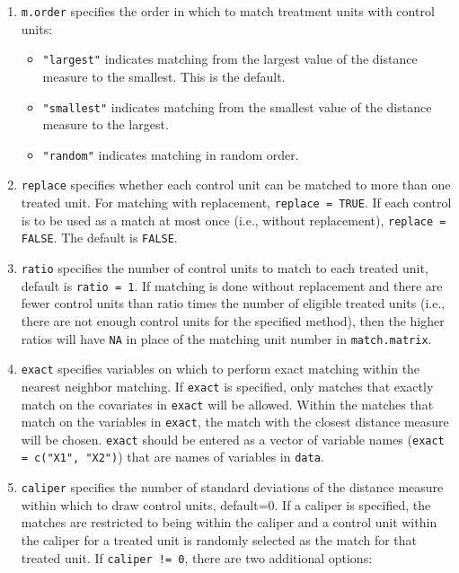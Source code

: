 \documentclass[oneside,letterpaper,titlepage]{article}
\begin{document}
\begin{enumerate}
\item \texttt{m.order}  specifies the order in which to match
  treatment units with control units:
  \begin{itemize}
  \item {\tt "largest"} indicates matching from the largest value of
    the distance measure to the smallest. This is the default.
  \item {\tt "smallest"} indicates matching from the smallest value of
    the distance measure to the largest.
  \item {\tt "random"} indicates matching in random order.
  \end{itemize}
\item \texttt{replace} specifies whether each control unit can be
  matched to more than one treated unit.  For matching with
  replacement, \texttt{replace = TRUE}.  If each control is to be used
  as a match at most once (i.e., without replacement), \texttt{replace
    = FALSE}. The default is {\tt FALSE}.
\item \texttt{ratio} specifies the number of control units to match to
  each treated unit, default is {\tt ratio = 1}.  If matching is done
  without replacement and there are fewer control units than ratio
  times the number of eligible treated units (i.e., there are not
  enough control units for the specified method), then the higher
  ratios will have \texttt{NA} in place of the matching unit number in
  \texttt{match.matrix}.
\item \texttt{exact} specifies variables on which to perform exact
  matching within the nearest neighbor matching.  If \texttt{exact} is
  specified, only matches that exactly match on the covariates in
  \texttt{exact} will be allowed.  Within the matches that match on
  the variables in \texttt{exact}, the match with the closest distance
  measure will be chosen.  \texttt{exact} should be entered as a
  vector of variable names (\texttt{exact = c("X1", "X2")}) that are
  names of variables in \texttt{data}.
\item \texttt{caliper} specifies the number of standard deviations of
  the distance measure within which to draw control units, default=0.
  If a caliper is specified, the matches are restricted to being
  within the caliper and a control unit within the caliper for a
  treated unit is randomly selected as the match for that treated
  unit.  If \texttt{caliper != 0}, there are two additional options:
  \begin{itemize} 

\end{itemize}
\end{enumerate}
\end{document}
